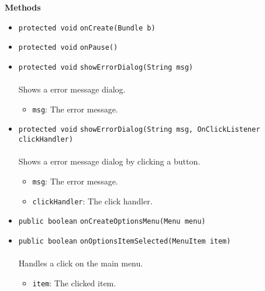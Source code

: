 \textbf{\sffamily Methods}
\begin{itemize}
\item \lstinline|protected void| \lstinline|onCreate|\lstinline|(Bundle b)| \\[-0.6em]




\item \lstinline|protected void| \lstinline|onPause|\lstinline|()| \\[-0.6em]




\item \lstinline|protected void| \lstinline|showErrorDialog|\lstinline|(String msg)|\\ \\[-0.6em]
Shows a error message dialog.
\begin{itemize}
\item \lstinline|msg|: The error message.
\end{itemize}



\item \lstinline|protected void| \lstinline|showErrorDialog|\lstinline|(String msg, OnClickListener clickHandler)|\\ \\[-0.6em]
Shows a error message dialog by clicking a button.
\begin{itemize}
\item \lstinline|msg|: The error message.
\item \lstinline|clickHandler|: The click handler.
\end{itemize}



\item \lstinline|public boolean| \lstinline|onCreateOptionsMenu|\lstinline|(Menu menu)| \\[-0.6em]




\item \lstinline|public boolean| \lstinline|onOptionsItemSelected|\lstinline|(MenuItem item)|\\ \\[-0.6em]
Handles a click on the main menu.
\begin{itemize}
\item \lstinline|item|: The clicked item.
\end{itemize}



\end{itemize}

